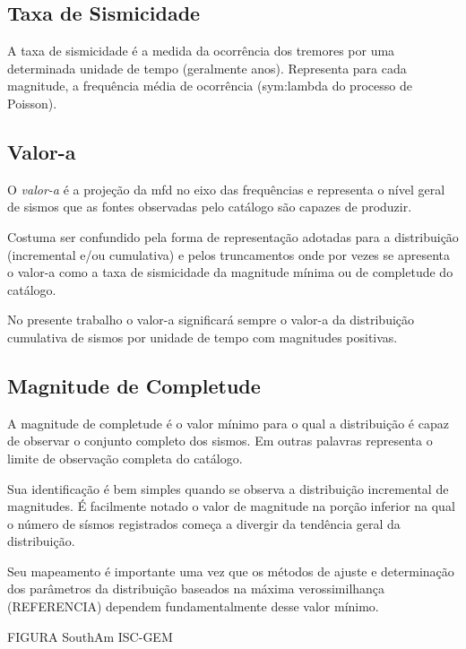 \subsection{Taxa de Sismicidade}
\label{sec:seismic_rate}

A taxa de sismicidade é a medida da ocorrência dos tremores por uma determinada unidade de tempo (geralmente anos).
Representa para cada magnitude, a frequência média de ocorrência (\gls{sym:lambda} do processo de Poisson).

\subsection{Valor-a}
\label{sec:a_value}

O \emph{valor-a} é a projeção da \gls{mfd} no eixo das frequências e representa o nível geral de sismos
que as fontes observadas pelo catálogo são capazes de produzir.

Costuma ser confundido pela forma de representação adotadas para a distribuição (incremental e/ou
cumulativa) e pelos truncamentos onde por vezes se apresenta o valor-a como a taxa de sismicidade da 
magnitude mínima ou de completude do catálogo.

No presente trabalho o valor-a significará sempre o valor-a da distribuição cumulativa de sismos por unidade de tempo
com magnitudes positivas.

\subsection{Magnitude de Completude}
\label{sec:completeness}

A magnitude de completude é o valor mínimo para o qual a distribuição é capaz de observar o conjunto completo dos
sismos. Em outras palavras representa o limite de observação completa do catálogo.

Sua identificação é bem simples quando se observa a distribuição incremental de magnitudes. É facilmente notado o valor
de magnitude na porção inferior na qual o número de sísmos registrados começa a divergir da tendência geral da
distribuição.

Seu mapeamento é importante uma vez que os métodos de ajuste e determinação dos parâmetros da distribuição baseados na
máxima verossimilhança (REFERENCIA) dependem fundamentalmente desse valor mínimo.



FIGURA SouthAm ISC-GEM



